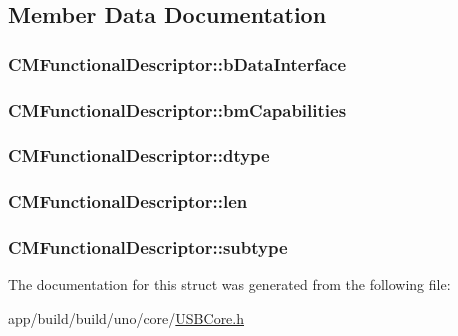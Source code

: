 \subsection{Member Data Documentation}
\hypertarget{struct_c_m_functional_descriptor_aea53687b85e0c589de6923a53023e6a6}{
\subsubsection[{b\-Data\-Interface}]{ C\-M\-Functional\-Descriptor\-::b\-Data\-Interface}}\label{struct_c_m_functional_descriptor_aea53687b85e0c589de6923a53023e6a6}
\hypertarget{struct_c_m_functional_descriptor_ab7e0bfe190791304ff4fdda9daa4c0bd}{
\subsubsection[{bm\-Capabilities}]{ C\-M\-Functional\-Descriptor\-::bm\-Capabilities}}\label{struct_c_m_functional_descriptor_ab7e0bfe190791304ff4fdda9daa4c0bd}
\hypertarget{struct_c_m_functional_descriptor_ab76c402780d22b9410950a5a007f2d9c}{
\subsubsection[{dtype}]{ C\-M\-Functional\-Descriptor\-::dtype}}\label{struct_c_m_functional_descriptor_ab76c402780d22b9410950a5a007f2d9c}
\hypertarget{struct_c_m_functional_descriptor_ad1d12222b3392d7b522bb96b57150324}{
\subsubsection[{len}]{ C\-M\-Functional\-Descriptor\-::len}}\label{struct_c_m_functional_descriptor_ad1d12222b3392d7b522bb96b57150324}
\hypertarget{struct_c_m_functional_descriptor_a07b6c7a42fb152c50eeee9f8e80b7552}{
\subsubsection[{subtype}]{ C\-M\-Functional\-Descriptor\-::subtype}}\label{struct_c_m_functional_descriptor_a07b6c7a42fb152c50eeee9f8e80b7552}


The documentation for this struct was generated from the following file\-:\begin{DoxyCompactItemize}
\item 
app/build/build/uno/core/\hyperlink{_u_s_b_core_8h}{U\-S\-B\-Core.\-h}\end{DoxyCompactItemize}
